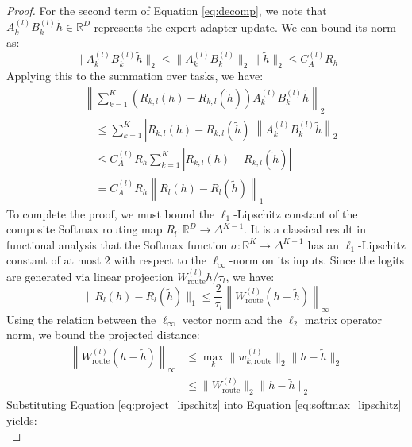 \begin{proof}
For the second term of Equation \ref{eq:decomp}, we note that $A_k^{(l)} B_k^{(l)} \tilde{h} \in \mathbb{R}^D$ represents the expert adapter update. We can bound its norm as:
\begin{equation}
\label{eq:adapter_out_bound}
\|A_k^{(l)} B_k^{(l)} \tilde{h}\|_2 \le \|A_k^{(l)} B_k^{(l)}\|_2 \|\tilde{h}\|_2 \le C_A^{(l)} R_h
\end{equation}
Applying this to the summation over tasks, we have:
\begin{align}
\label{eq:term2_bound}
& \left\| \sum_{k=1}^K \left( R_{k, l}(h) - R_{k, l}(\tilde{h}) \right) A_k^{(l)} B_k^{(l)} \tilde{h} \right\|_2 \nonumber \\
& \quad \le \sum_{k=1}^K \left| R_{k, l}(h) - R_{k, l}(\tilde{h}) \right| \left\| A_k^{(l)} B_k^{(l)} \tilde{h} \right\|_2 \nonumber \\
& \quad \le C_A^{(l)} R_h \sum_{k=1}^K \left| R_{k, l}(h) - R_{k, l}(\tilde{h}) \right| \nonumber \\
& \quad = C_A^{(l)} R_h \left\| R_l(h) - R_l(\tilde{h}) \right\|_1
\end{align}
To complete the proof, we must bound the $\ell_1$-Lipschitz constant of the composite Softmax routing map $R_l: \mathbb{R}^D \to \Delta^{K-1}$. It is a classical result in functional analysis that the Softmax function $\sigma: \mathbb{R}^K \to \Delta^{K-1}$ has an $\ell_1$-Lipschitz constant of at most $2$ with respect to the $\ell_\infty$-norm on its inputs. Since the logits are generated via linear projection $W_{\text{route}}^{(l)} h / \tau_l$, we have:
\begin{equation}
\label{eq:softmax_lipschitz}
\|R_l(h) - R_l(\tilde{h})\|_1 \le \frac{2}{\tau_l} \left\| W_{\text{route}}^{(l)} (h - \tilde{h}) \right\|_\infty
\end{equation}
Using the relation between the $\ell_\infty$ vector norm and the $\ell_2$ matrix operator norm, we bound the projected distance:
\begin{equation}
\label{eq:project_lipschitz}
\begin{split}
\left\| W_{\text{route}}^{(l)} (h - \tilde{h}) \right\|_\infty & \le \max_k \|w_{k, \text{route}}^{(l)}\|_2 \|h - \tilde{h}\|_2 \\
& \le \|W_{\text{route}}^{(l)}\|_2 \|h - \tilde{h}\|_2
\end{split}
\end{equation}
Substituting Equation \ref{eq:project_lipschitz} into Equation \ref{eq:softmax_lipschitz} yields:
\begin{equation}

\end{equation}
\end{proof}
